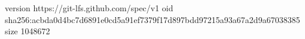 version https://git-lfs.github.com/spec/v1
oid sha256:acbda0d4bc7d6891e0cd5a91ef7379f17d897bdd97215a93a67a2d9a67038385
size 1048672
